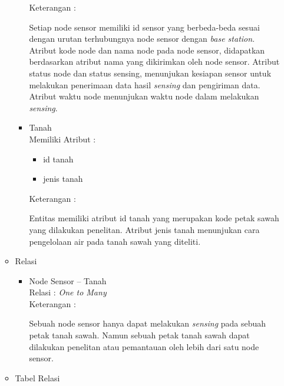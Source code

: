 \begin{itemize}
\begin{itemize}
\begin{itemize}
         Keterangan :
         
         \quad Setiap node sensor memiliki id sensor yang berbeda-beda sesuai dengan urutan terhubungnya node sensor dengan \textit{base station}. Atribut kode node dan nama node pada node sensor, didapatkan berdasarkan atribut nama yang dikirimkan oleh node sensor. Atribut status node dan status sensing, menunjukan kesiapan sensor untuk melakukan penerimaan data hasil \textit{sensing} dan pengiriman data. Atribut waktu node menunjukan waktu node dalam melakukan \textit{sensing}.\\
     \end{itemize}
     
  
     \begin{itemize}
         \item Tanah\\
         Memiliki Atribut :
         \begin{itemize}
             \item id tanah
             \item jenis tanah
         \end{itemize}
         
         Keterangan :
         
         \quad Entitas memiliki atribut id tanah yang merupakan kode petak sawah yang dilakukan penelitan. Atribut jenis tanah menunjukan cara pengelolaan air pada tanah sawah yang diteliti.
     \end{itemize}
            
            \item Relasi
            \begin{itemize}

                 
                 \item Node Sensor -- Tanah\\
                 Relasi : \textit{One to Many}\\
                 Keterangan :
                 
                 
                 \quad Sebuah node sensor hanya dapat melakukan \textit{sensing} pada sebuah petak tanah sawah. Namun sebuah petak tanah sawah dapat dilakukan penelitan atau pemantauan oleh lebih dari satu node sensor.\\
                 
            \end{itemize}
            
            \item Tabel Relasi
            \begin{itemize}
                 

\end{itemize}
\end{itemize}
\end{itemize}
